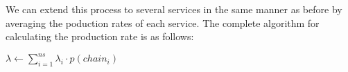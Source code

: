 We can extend this process to several services in the same manner as before by averaging the poduction rates of each service. The complete algorithm for calculating the production rate is as follows:

\begin{algorithmic}[1]

\ENDFOR

\STATE $\lambda \leftarrow \sum_{i=1}^{ns} \lambda_i \cdot p(chain_i)$

\end{algorithmic}
